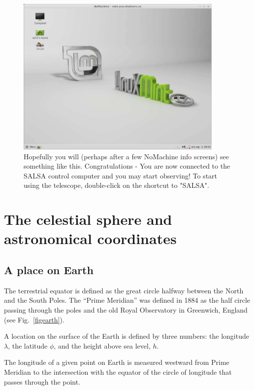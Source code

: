 \begin{figure}[H]
    \centering
	\includegraphics[width=0.9\textwidth]{../figures/nomachinefigs/fig9-connected.pdf}
    \caption{Hopefully you will (perhaps after a few NoMachine info screens)
see something like this. Congratulations - You are now connected to the SALSA
control computer and you may start observing! 
To start using the telescope, double-click on the shortcut to "SALSA".} \label{fig:connected}
\end{figure}

\chapter{The celestial sphere and astronomical coordinates}
\label{app:coord}

\section{A place on Earth}

The terrestrial equator is defined as the great circle halfway between
the North and the South Poles.  The ``Prime Meridian'' was defined in
1884 as the half circle passing through the poles and the old Royal
Observatory in Greenwich, England (see Fig.~\ref{figearth}).

A location on the surface of the Earth is defined by three numbers:
the longitude $\lambda$, the latitude $\phi$, and the height above sea
level, $h$.

The longitude of a given point on Earth is measured westward from
Prime Meridian to the intersection with the equator of the circle of
longitude that passes through the point.

